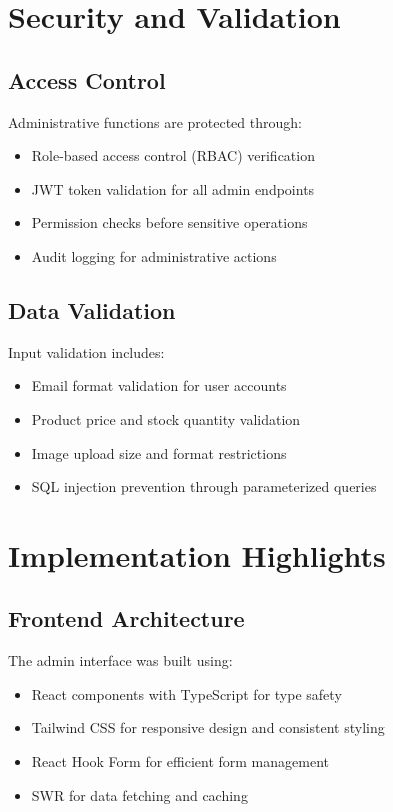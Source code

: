 \section{Security and Validation}

\subsection*{Access Control}

Administrative functions are protected through:
\begin{itemize}
  \item Role-based access control (RBAC) verification
  \item JWT token validation for all admin endpoints
  \item Permission checks before sensitive operations
  \item Audit logging for administrative actions
\end{itemize}

\subsection*{Data Validation}

Input validation includes:
\begin{itemize}
  \item Email format validation for user accounts
  \item Product price and stock quantity validation
  \item Image upload size and format restrictions
  \item SQL injection prevention through parameterized queries
\end{itemize}

\section{Implementation Highlights}

\subsection*{Frontend Architecture}

The admin interface was built using:
\begin{itemize}
  \item React components with TypeScript for type safety
  \item Tailwind CSS for responsive design and consistent styling
  \item React Hook Form for efficient form management
  \item SWR for data fetching and caching
\end{itemize}

